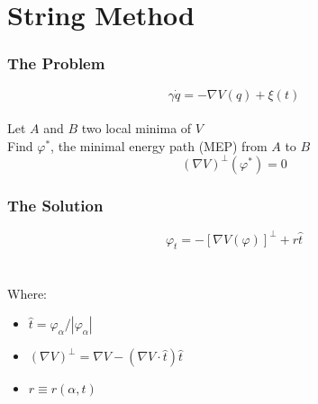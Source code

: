 \documentclass{beamer}
\renewcommand{\phi}{\varphi}
\renewcommand{\(}{\left(}
\renewcommand{\)}{\right)}
\begin{document}
\section{String Method}
\begin{frame}
\frametitle{The Problem}
$$\gamma \dot{q} = -\nabla V(q)+\xi(t)$$
~\\
Let $A$ and $B$ two local minima of $V$\\
Find $\phi^*$, the minimal energy path (MEP) from $A$ to $B$
$$(\nabla V)^\bot(\phi^*)=0$$
\end{frame}

\begin{frame}
\frametitle{The Solution}
$$\phi_t=-[\nabla V(\phi)]^\bot+r\hat t$$
~\\
~\\
Where:
\begin{itemize}
\item $\hat t = {\phi_\alpha}/{|\phi_\alpha|}$%
\item $(\nabla V)^\bot = \nabla V - (\nabla V \cdot \hat t)\hat t$%
\item $r \equiv r(\alpha, t)$%
\end{itemize}
\end{frame}
\end{document}
